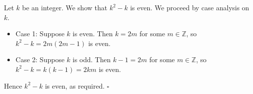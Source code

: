 Let $k$ be an integer.
We show that $k^{2} - k$ is even.
We proceed by case analysis on $k$.

\begin{itemize}
  \item Case 1: Suppose $k$ is even.
    Then $k = 2m$ for some $m \in \mathbb{Z}$, so $k^{2} - k = 2m(2m - 1)$ is even.
  \item Case 2: Suppose $k$ is odd.
    Then $k - 1 = 2m$ for some $m \in \mathbb{Z}$, so $k^{2} - k = k(k - 1) = 2km$ is even.
\end{itemize}

Hence $k^{2} - k$ is even, as required. \hfill$\square$